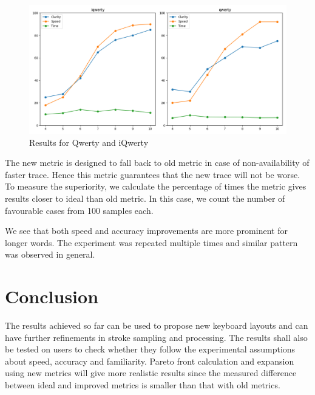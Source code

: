 \documentclass[MTech]{iitmdiss}
\begin{document}
\begin{figure}[h!]
	\centering
	\includegraphics[scale=0.5]{Images/result}
	\caption{Results for Qwerty and iQwerty}
\end{figure}


The new metric is designed to fall back to old metric in case of non-availability of faster trace. Hence this metric guarantees that the new trace will not be worse. To measure the superiority, we calculate the percentage of times the metric gives results closer to ideal than old metric. In this case, we count the number of favourable cases from 100 samples each.


We see that both speed and accuracy improvements are more prominent for longer words. The experiment was repeated multiple times and similar pattern was observed in general.  

\chapter{Conclusion}
The results achieved so far can be used to propose new keyboard layouts and can have further refinements in stroke sampling and processing. The results shall also be tested on users to check whether they follow the experimental assumptions about speed, accuracy and familiarity. Pareto front calculation and expansion using new metrics will give more realistic results since the measured difference between ideal and improved metrics is smaller than that with old metrics.



\begin{singlespace}
	
\end{singlespace}
\end{document}
